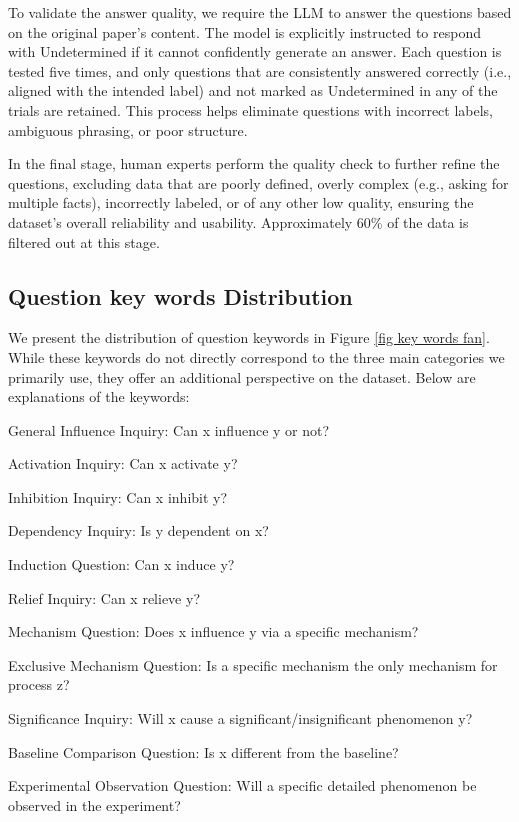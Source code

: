 To validate the answer quality, we require the LLM to answer the questions based on the original paper's content. The model is explicitly instructed to respond with Undetermined if it cannot confidently generate
an
answer. Each question is tested five times, and only questions that are consistently answered correctly (i.e., aligned
with the intended label) and not marked as Undetermined in any of the trials are retained. This process helps eliminate
questions with incorrect labels, ambiguous phrasing, or poor structure.

In the final stage, human experts perform the quality check to further refine the questions, excluding data that are poorly defined, overly complex (e.g., asking for multiple facts), incorrectly labeled, or of any other low quality, ensuring the dataset's overall reliability and usability. Approximately 60\% of the data is filtered out at this stage.



\subsection{Question key words Distribution}

We present the distribution of question keywords in Figure \ref{fig key words fan}. While these keywords do not directly correspond to the three main categories we primarily use, they offer an additional perspective on the dataset. Below are explanations of the keywords:

General Influence Inquiry: Can x influence y or not?

Activation Inquiry: Can x activate y?

Inhibition Inquiry: Can x inhibit y?

Dependency Inquiry: Is y dependent on x?

Induction Question: Can x induce y?

Relief Inquiry: Can x relieve y?

Mechanism Question: Does x influence y via a specific mechanism?

Exclusive Mechanism Question: Is a specific mechanism the only mechanism for process z?

Significance Inquiry: Will x cause a significant/insignificant phenomenon y?

Baseline Comparison Question: Is x different from the baseline?

Experimental Observation Question: Will a specific detailed phenomenon be observed in the experiment?

